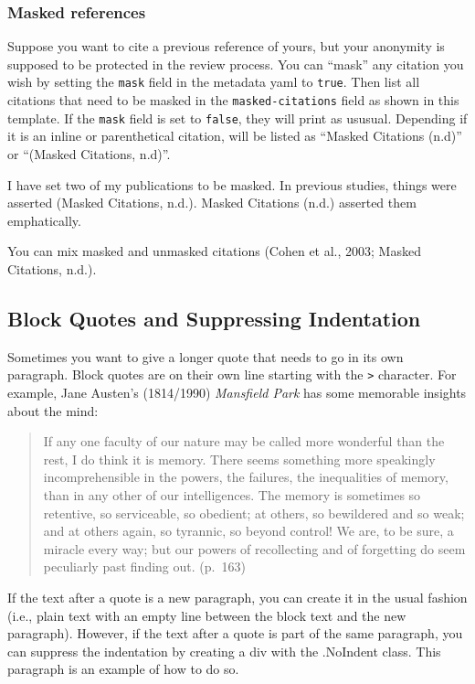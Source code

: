 \documentclass[
  man,
  floatsintext,
  longtable,
  colorlinks=true,linkcolor=blue,citecolor=blue,urlcolor=blue]{apa7}
\begin{document}
\subsubsection{Masked references}\label{masked-references}

Suppose you want to cite a previous reference of yours, but your
anonymity is supposed to be protected in the review process. You can
``mask'' any citation you wish by setting the \texttt{mask} field in the
metadata yaml to \texttt{true}. Then list all citations that need to be
masked in the \texttt{masked-citations} field as shown in this template.
If the \texttt{mask} field is set to \texttt{false}, they will print as
ususual. Depending if it is an inline or parenthetical citation, will be
listed as ``Masked Citations (n.d)'' or ``(Masked Citations, n.d)''.

I have set two of my publications to be masked. In previous studies,
things were asserted (Masked Citations, n.d.). Masked Citations (n.d.)
asserted them emphatically.

You can mix masked and unmasked citations (Cohen et al., 2003; Masked
Citations, n.d.).

\subsection{Block Quotes and Suppressing
Indentation}\label{block-quotes-and-suppressing-indentation}

Sometimes you want to give a longer quote that needs to go in its own
paragraph. Block quotes are on their own line starting with the
\texttt{\textgreater{}} character. For example, Jane Austen's
(1814/1990) \emph{Mansfield Park} has some memorable insights about the
mind:

\begin{quote}
If any one faculty of our nature may be called more wonderful than the
rest, I do think it is memory. There seems something more speakingly
incomprehensible in the powers, the failures, the inequalities of
memory, than in any other of our intelligences. The memory is sometimes
so retentive, so serviceable, so obedient; at others, so bewildered and
so weak; and at others again, so tyrannic, so beyond control! We are, to
be sure, a miracle every way; but our powers of recollecting and of
forgetting do seem peculiarly past finding out. (p.~163)
\end{quote}

\noindent If the text after a quote is a new paragraph, you can create
it in the usual fashion (i.e., plain text with an empty line between the
block text and the new paragraph). However, if the text after a quote is
part of the same paragraph, you can suppress the indentation by creating
a div with the .NoIndent class. This paragraph is an example of how to
do so.
\end{document}
